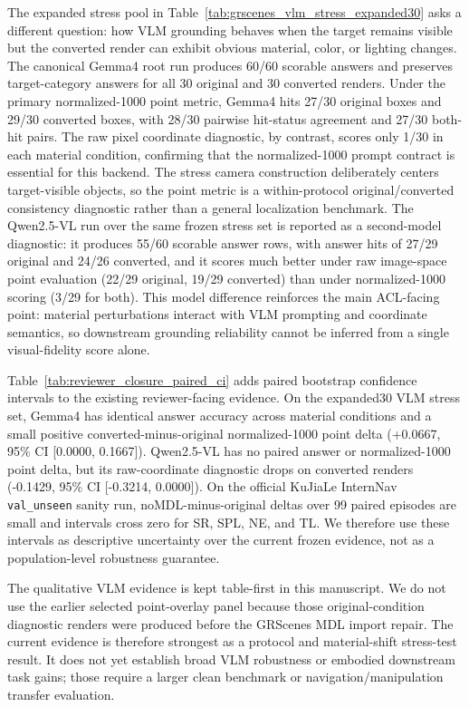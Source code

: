 The expanded stress pool in
Table~\ref{tab:grscenes_vlm_stress_expanded30} asks a different question: how
VLM grounding behaves when the target remains visible but the converted render
can exhibit obvious material, color, or lighting changes. The canonical Gemma4
root run produces 60/60 scorable answers and preserves target-category answers
for all 30 original and 30 converted renders. Under the primary normalized-1000
point metric, Gemma4 hits 27/30 original boxes and 29/30 converted boxes, with
28/30 pairwise hit-status agreement and 27/30 both-hit pairs. The raw pixel
coordinate diagnostic, by contrast, scores only 1/30 in each material condition,
confirming that the normalized-1000 prompt contract is essential for this
backend. The stress camera construction deliberately centers target-visible
objects, so the point metric is a within-protocol original/converted
consistency diagnostic rather than a general localization benchmark. The
Qwen2.5-VL run over the same frozen stress set is reported as a
second-model diagnostic: it produces 55/60 scorable answer rows, with answer
hits of 27/29 original and 24/26 converted, and it scores much better under raw
image-space point evaluation (22/29 original, 19/29 converted) than under
normalized-1000 scoring (3/29 for both). This model difference reinforces the
main ACL-facing point: material perturbations interact with VLM prompting and
coordinate semantics, so downstream grounding reliability cannot be inferred
from a single visual-fidelity score alone.



Table~\ref{tab:reviewer_closure_paired_ci} adds paired bootstrap confidence
intervals to the existing reviewer-facing evidence. On the expanded30 VLM
stress set, Gemma4 has identical answer accuracy across material conditions and
a small positive converted-minus-original normalized-1000 point delta
(+0.0667, 95\% CI [0.0000, 0.1667]). Qwen2.5-VL has no paired answer or
normalized-1000 point delta, but its raw-coordinate diagnostic drops on
converted renders (-0.1429, 95\% CI [-0.3214, 0.0000]). On the official
KuJiaLe InternNav \texttt{val\_unseen} sanity run, noMDL-minus-original deltas
over 99 paired episodes are small and intervals cross zero for SR, SPL, NE, and
TL. We therefore use these intervals as descriptive uncertainty over the
current frozen evidence, not as a population-level robustness guarantee.

The qualitative VLM evidence is kept table-first in this manuscript. We do not
use the earlier selected point-overlay panel because those original-condition
diagnostic renders were produced before the GRScenes MDL import repair. The
current evidence is therefore strongest as a protocol and material-shift
stress-test result. It does not yet establish broad VLM robustness or embodied
downstream task gains; those require a larger clean benchmark or
navigation/manipulation transfer evaluation.

